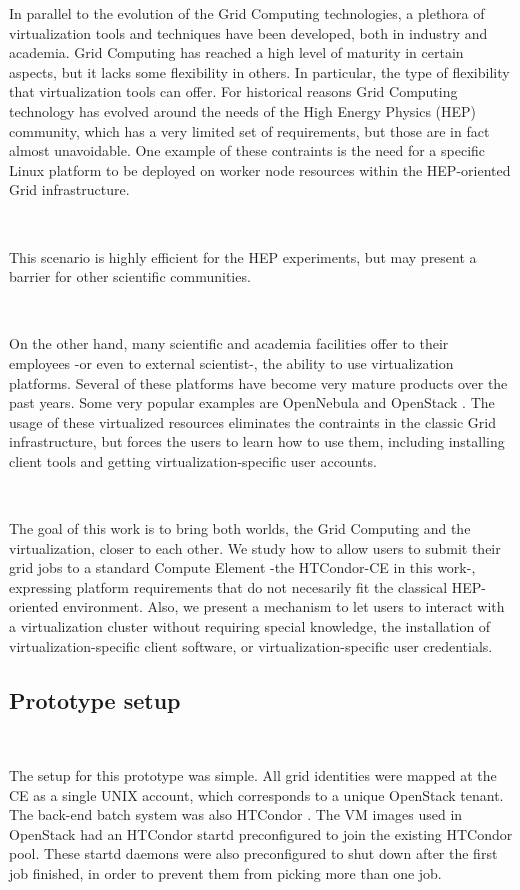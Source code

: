 \documentclass[a4paper]{jpconf}
\begin{document}
In parallel to the evolution of the Grid Computing technologies, a plethora of
virtualization tools and techniques have been developed, both in industry and academia.
Grid Computing has reached a high level of maturity in certain aspects, but it
lacks some flexibility in others.
In particular, the type of flexibility that virtualization tools can offer. 
For historical reasons Grid Computing technology has evolved around the needs of the High Energy Physics (HEP) community, 
which has a very limited set of requirements, but those are in fact almost
unavoidable. One example of these contraints is the need for a specific Linux
platform to be deployed on worker node resources within the HEP-oriented
Grid infrastructure.

~

This scenario is highly efficient for the HEP experiments, 
but may present a barrier for other scientific communities.

~

On the other hand, many scientific and academia facilities offer to their employees -or even to external scientist-,
the ability to use virtualization platforms. 
Several of these platforms have become very mature products over the past years.
Some very popular examples are OpenNebula \cite{opennebula} and OpenStack \cite{openstack}.
The usage of these virtualized resources eliminates the contraints in the
classic Grid infrastructure, but forces the users to learn how to use them,
including installing client tools and getting virtualization-specific
user accounts.

~

The goal of this work is to bring both worlds, the Grid Computing and the virtualization, closer to each other. 
We study how to allow users to submit their grid jobs to a standard Compute Element -the HTCondor-CE \cite{condorce} in this work-,
expressing platform requirements that do not necesarily fit the classical HEP-oriented environment.
Also, we present a mechanism to let users to interact with a virtualization cluster without requiring
special knowledge, the installation of virtualization-specific client software,
or virtualization-specific user credentials.

\subsection{Prototype setup} \label{prototype}

~

The setup for this prototype was simple. 
All grid identities were mapped at the CE as a single UNIX account, which
corresponds to a unique OpenStack tenant.
The back-end batch system was also HTCondor \cite{condor}.
The VM images used in OpenStack had an HTCondor startd preconfigured to join the
existing HTCondor pool.
These startd daemons were also preconfigured to shut down after the first job finished, in order to prevent them from picking more than one job. 
\end{document}
